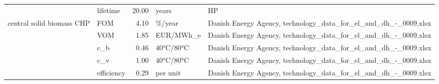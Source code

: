 \begin{longtable}{p{5cm}p{3cm}rp{3cm}p{11cm}}
                      & lifetime &          20.00 &                             years &                                                                                                                                                                                                                                                                                                                                   HP \\
central solid biomass CHP & FOM &           4.10 &                            \%/year &                                                                                                                                                                                                                                                                      Danish Energy Agency, technology\_data\_for\_el\_and\_dh\_-\_0009.xlsx \\
                      & VOM &           1.85 &                         EUR/MWh\_e &                                                                                                                                                                                                                                                                      Danish Energy Agency, technology\_data\_for\_el\_and\_dh\_-\_0009.xlsx \\
                      & c\_b &           0.46 &                         40°C/80°C &                                                                                                                                                                                                                                                                      Danish Energy Agency, technology\_data\_for\_el\_and\_dh\_-\_0009.xlsx \\
                      & c\_v &           1.00 &                         40°C/80°C &                                                                                                                                                                                                                                                                      Danish Energy Agency, technology\_data\_for\_el\_and\_dh\_-\_0009.xlsx \\
                      & efficiency &           0.29 &                          per unit &                                                                                                                                                                                                                                                                      Danish Energy Agency, technology\_data\_for\_el\_and\_dh\_-\_0009.xlsx \\

\end{longtable}
